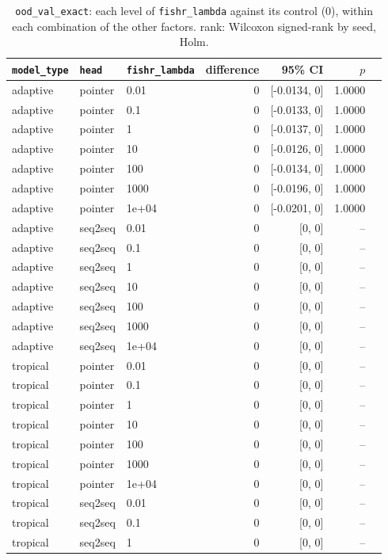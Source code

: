 \documentclass[10pt]{article}
\begin{document}
{\small
\begin{longtable}{lllrrrl}
\caption{\texttt{ood\_val\_exact}: each level of \texttt{fishr\_lambda} against its control (0), within each combination of the other factors. rank: Wilcoxon signed-rank by seed, Holm.}\label{tab:control-ood_val_exact}\\
\toprule
\texttt{model\_type} & \texttt{head} & \texttt{fishr\_lambda} & difference & 95\% CI & $p$ & \\
\midrule
\endhead
adaptive & pointer & 0.01 & 0 & [-0.0134, 0] & 1.0000 & \\
adaptive & pointer & 0.1 & 0 & [-0.0133, 0] & 1.0000 & \\
adaptive & pointer & 1 & 0 & [-0.0137, 0] & 1.0000 & \\
adaptive & pointer & 10 & 0 & [-0.0126, 0] & 1.0000 & \\
adaptive & pointer & 100 & 0 & [-0.0134, 0] & 1.0000 & \\
adaptive & pointer & 1000 & 0 & [-0.0196, 0] & 1.0000 & \\
adaptive & pointer & 1e+04 & 0 & [-0.0201, 0] & 1.0000 & \\
adaptive & seq2seq & 0.01 & 0 & [0, 0] & -- & \\
adaptive & seq2seq & 0.1 & 0 & [0, 0] & -- & \\
adaptive & seq2seq & 1 & 0 & [0, 0] & -- & \\
adaptive & seq2seq & 10 & 0 & [0, 0] & -- & \\
adaptive & seq2seq & 100 & 0 & [0, 0] & -- & \\
adaptive & seq2seq & 1000 & 0 & [0, 0] & -- & \\
adaptive & seq2seq & 1e+04 & 0 & [0, 0] & -- & \\
tropical & pointer & 0.01 & 0 & [0, 0] & -- & \\
tropical & pointer & 0.1 & 0 & [0, 0] & -- & \\
tropical & pointer & 1 & 0 & [0, 0] & -- & \\
tropical & pointer & 10 & 0 & [0, 0] & -- & \\
tropical & pointer & 100 & 0 & [0, 0] & -- & \\
tropical & pointer & 1000 & 0 & [0, 0] & -- & \\
tropical & pointer & 1e+04 & 0 & [0, 0] & -- & \\
tropical & seq2seq & 0.01 & 0 & [0, 0] & -- & \\
tropical & seq2seq & 0.1 & 0 & [0, 0] & -- & \\
tropical & seq2seq & 1 & 0 & [0, 0] & -- & \\

\end{longtable}}
\end{document}
